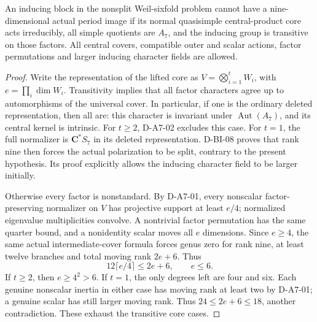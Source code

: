 \begin{theorem}
\label{D-A7-03}
An inducing block in the nonsplit Weil-sixfold problem cannot
have a nine-dimensional actual period image if its normal
quasisimple central-product core acts irreducibly, all simple
quotients are $A_7$, and the inducing group is transitive on those
factors. All central covers, compatible outer and scalar actions,
factor permutations and larger inducing character fields are
allowed.
\end{theorem}

\begin{proof}
Write the representation of the lifted core as
$V=\bigotimes_{i=1}^tW_i$, with $e=\prod_i\dim W_i$.
Transitivity implies that all factor characters agree up to
automorphisms of the universal cover. In particular, if one is
the ordinary deleted representation, then all are: this character
is invariant under $\operatorname{Aut}(A_7)$, and its central
kernel is intrinsic. For $t\ge2$, D-A7-02 excludes this case.
For $t=1$, the full normalizer is
$\mathbf C^*S_7$ in its deleted representation. D-BI-08 proves
that rank nine then forces the actual polarization to be split,
contrary to the present hypothesis. Its proof explicitly allows
the inducing character field to be larger initially.

Otherwise every factor is nonstandard. By D-A7-01, every
nonscalar factor-preserving normalizer on $V$ has projective
support at least $e/4$; normalized eigenvalue multiplicities
convolve. A nontrivial factor permutation has the same quarter
bound, and a nonidentity scalar moves all $e$ dimensions.
Since $e\ge4$, the same actual intermediate-cover formula forces
genus zero for rank nine, at least twelve branches and total
moving rank $2e+6$. Thus
\[
                  12\lceil e/4\rceil\le2e+6,
                              \qquad e\le6.             \tag{A7.6}
\]
If $t\ge2$, then $e\ge4^2>6$. If $t=1$, the only degrees
left are four and six. Each genuine nonscalar inertia in either
case has moving rank at least two by D-A7-01; a genuine scalar
has still larger moving rank. Thus $24\le2e+6\le18$, another
contradiction. These exhaust the transitive core cases.
\end{proof}


